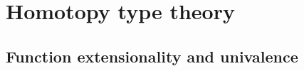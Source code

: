 \documentclass[hott-all.tex]{subfiles}
\begin{document}
%

\section{Homotopy type theory}
\label{sec:hott-features}


\subsection{Function extensionality and univalence}

\end{document}
